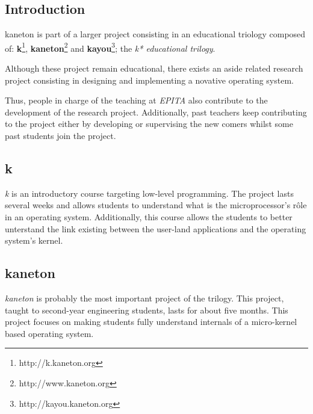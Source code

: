 \begin{multicols}{2}

\tableofcontents

%
%

\section{Introduction}

kaneton is part of a larger project consisting in an educational
triology composed of:
  \textbf{k}\footnote{http://k.kaneton.org},
  \textbf{kaneton}\footnote{http://www.kaneton.org} and
  \textbf{kayou}\footnote{http://kayou.kaneton.org}; the
\textit{k* educational trilogy}.

Although these project remain educational, there exists an aside related
research project consisting in designing and implementing a novative operating
system.

Thus, people in charge of the teaching at \textit{EPITA} also contribute to
the development of the research project. Additionally, past teachers keep
contributing to the project either by developing or supervising the
new comers whilst some past students join the project.

%
%

\subsection{k}

\textit{k} is an introductory course targeting low-level programming. The
project lasts several weeks and allows students to understand what is the
microprocessor's r\^ole in an operating system. Additionally, this course
allows the students to better unterstand the link existing between the
user-land applications and the operating system's kernel.

%
%

\subsection{kaneton}

\textit{kaneton} is probably the most important project of the trilogy. This
project, taught to second-year engineering students, lasts for about five
months. This project focuses on making students fully understand
internals of a micro-kernel based operating system.

%
%


\end{multicols}
